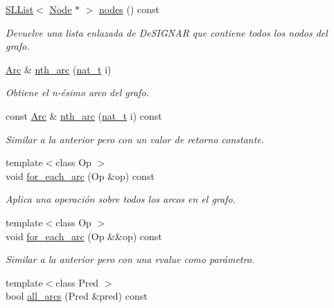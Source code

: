 \begin{DoxyCompactItemize}
\hyperlink{class_designar_1_1_s_l_list}{S\+L\+List}$<$ \hyperlink{namespace_designar_a5af326c65aa2bd26b26c410f2030d09e}{Node} $\ast$ $>$ \hyperlink{class_designar_1_1_base_graph_a56b1ec4a0258d9f22542f33615bcdbea}{nodes} () const
\begin{DoxyCompactList}\small\item\em Devuelve una lista enlazada de De\+S\+I\+G\+N\+AR que contiene todos los nodos del grafo. \end{DoxyCompactList}\item 
\hyperlink{namespace_designar_a3f55fb5513d62ff47cbc8f72b8e95d6f}{Arc} \& \hyperlink{class_designar_1_1_base_graph_a3fed87a68cc763e63369558423235e00}{nth\+\_\+arc} (\hyperlink{namespace_designar_aa72662848b9f4815e7bf31a7cf3e33d1}{nat\+\_\+t} i)
\begin{DoxyCompactList}\small\item\em Obtiene el n-\/ésimo arco del grafo. \end{DoxyCompactList}\item 
const \hyperlink{namespace_designar_a3f55fb5513d62ff47cbc8f72b8e95d6f}{Arc} \& \hyperlink{class_designar_1_1_base_graph_a2253d6f1e0d163f52ce1b928001e830d}{nth\+\_\+arc} (\hyperlink{namespace_designar_aa72662848b9f4815e7bf31a7cf3e33d1}{nat\+\_\+t} i) const
\begin{DoxyCompactList}\small\item\em Similar a la anterior pero con un valor de retorno constante. \end{DoxyCompactList}\item 
{\footnotesize template$<$class Op $>$ }\\void \hyperlink{class_designar_1_1_base_graph_ac46a1a7517a6c7029c6bae23d480cfa9}{for\+\_\+each\+\_\+arc} (Op \&op) const
\begin{DoxyCompactList}\small\item\em Aplica una operación sobre todos los arcos en el grafo. \end{DoxyCompactList}\item 
{\footnotesize template$<$class Op $>$ }\\void \hyperlink{class_designar_1_1_base_graph_ae76905d5baebd62d0fc481efc7c20f66}{for\+\_\+each\+\_\+arc} (Op \&\&op) const
\begin{DoxyCompactList}\small\item\em Similar a la anterior pero con una rvalue como parámetro. \end{DoxyCompactList}\item 
{\footnotesize template$<$class Pred $>$ }\\bool \hyperlink{class_designar_1_1_base_graph_a3e2a55dafde6b1edf42f88f4c7d066b8}{all\+\_\+arcs} (Pred \&pred) const

\end{DoxyCompactItemize}

